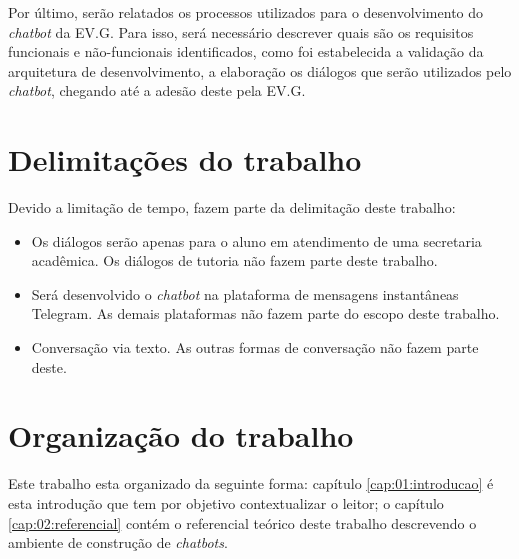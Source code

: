 Por último, serão relatados os processos utilizados para o desenvolvimento do \textit{chatbot} da EV.G. Para isso, será necessário descrever quais são os requisitos funcionais e não-funcionais identificados, como foi estabelecida a validação da arquitetura de desenvolvimento, a elaboração os diálogos que serão utilizados pelo \textit{chatbot}, chegando até a adesão deste pela EV.G.


\section{Delimitações do trabalho}\label{cap:01:sec:03:delimitacao}

Devido a limitação de tempo, fazem parte da delimitação deste trabalho:

\begin{itemize}
    \item Os diálogos serão apenas para o aluno em atendimento de uma secretaria acadêmica. Os diálogos de tutoria não fazem parte deste trabalho.
    \item Será desenvolvido o \textit{chatbot} na plataforma de mensagens instantâneas Telegram. As demais plataformas não fazem parte do escopo deste trabalho.
    \item Conversação via texto. As outras formas de conversação não fazem parte deste.
\end{itemize}


\section{Organização do trabalho}

Este trabalho esta organizado da seguinte forma: capítulo \ref{cap:01:introducao} é esta introdução que tem por objetivo contextualizar o leitor; o capítulo \ref{cap:02:referencial} contém o referencial teórico deste trabalho descrevendo o ambiente de construção de \textit{chatbots}.
